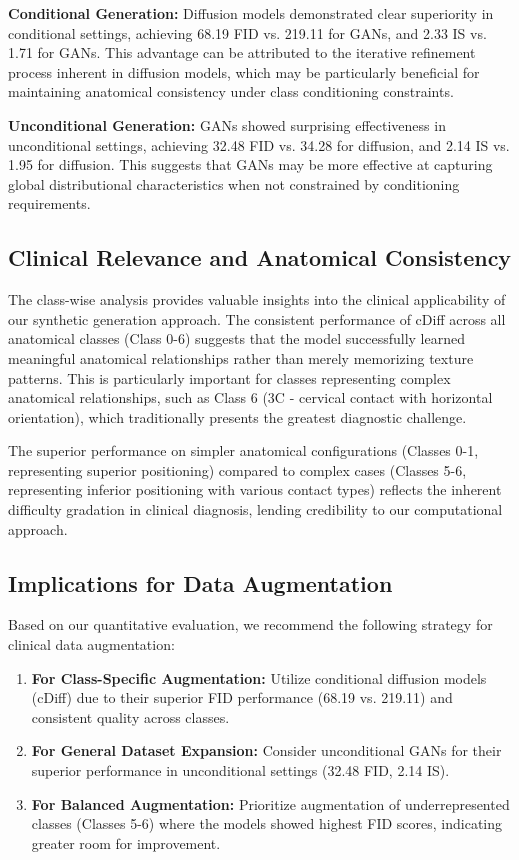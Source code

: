 \textbf{Conditional Generation:} Diffusion models demonstrated clear superiority in conditional settings, achieving 68.19 FID vs. 219.11 for GANs, and 2.33 IS vs. 1.71 for GANs. This advantage can be attributed to the iterative refinement process inherent in diffusion models, which may be particularly beneficial for maintaining anatomical consistency under class conditioning constraints.

\textbf{Unconditional Generation:} GANs showed surprising effectiveness in unconditional settings, achieving 32.48 FID vs. 34.28 for diffusion, and 2.14 IS vs. 1.95 for diffusion. This suggests that GANs may be more effective at capturing global distributional characteristics when not constrained by conditioning requirements.

\subsection{Clinical Relevance and Anatomical Consistency}

The class-wise analysis provides valuable insights into the clinical applicability of our synthetic generation approach. The consistent performance of cDiff across all anatomical classes (Class 0-6) suggests that the model successfully learned meaningful anatomical relationships rather than merely memorizing texture patterns. This is particularly important for classes representing complex anatomical relationships, such as Class 6 (3C - cervical contact with horizontal orientation), which traditionally presents the greatest diagnostic challenge.

The superior performance on simpler anatomical configurations (Classes 0-1, representing superior positioning) compared to complex cases (Classes 5-6, representing inferior positioning with various contact types) reflects the inherent difficulty gradation in clinical diagnosis, lending credibility to our computational approach.

\subsection{Implications for Data Augmentation}

Based on our quantitative evaluation, we recommend the following strategy for clinical data augmentation:

\begin{enumerate}
    \item \textbf{For Class-Specific Augmentation:} Utilize conditional diffusion models (cDiff) due to their superior FID performance (68.19 vs. 219.11) and consistent quality across classes.
    \item \textbf{For General Dataset Expansion:} Consider unconditional GANs for their superior performance in unconditional settings (32.48 FID, 2.14 IS).
    \item \textbf{For Balanced Augmentation:} Prioritize augmentation of underrepresented classes (Classes 5-6) where the models showed highest FID scores, indicating greater room for improvement.
\end{enumerate}

